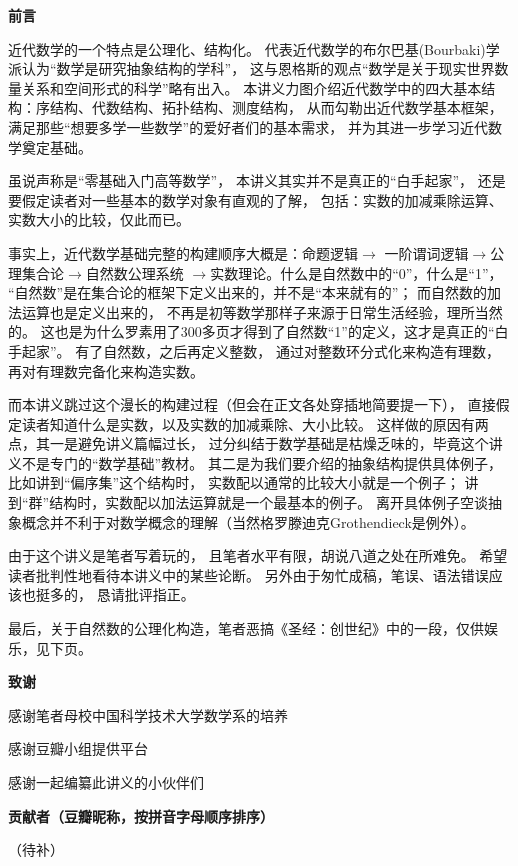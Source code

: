\textbf{前言}

近代数学的一个特点是公理化、结构化。
代表近代数学的布尔巴基(Bourbaki)学派认为“数学是研究抽象结构的学科”，
这与恩格斯的观点“数学是关于现实世界数量关系和空间形式的科学”略有出入。
本讲义力图介绍近代数学中的四大基本结构：序结构、代数结构、拓扑结构、测度结构，
从而勾勒出近代数学基本框架，满足那些“想要多学一些数学”的爱好者们的基本需求，
并为其进一步学习近代数学奠定基础。

虽说声称是“零基础入门高等数学”，
本讲义其实并不是真正的“白手起家”，
还是要假定读者对一些基本的数学对象有直观的了解，
包括：实数的加减乘除运算、实数大小的比较，仅此而已。

事实上，近代数学基础完整的构建顺序大概是：命题逻辑$\rightarrow$
一阶谓词逻辑$\rightarrow$公理集合论$\rightarrow$自然数公理系统
$\rightarrow$实数理论。什么是自然数中的“0”，什么是“1”，
“自然数”是在集合论的框架下定义出来的，并不是“本来就有的”；
而自然数的加法运算也是定义出来的，
不再是初等数学那样子来源于日常生活经验，理所当然的。
这也是为什么罗素用了300多页才得到了自然数“1”的定义，这才是真正的“白手起家”。
有了自然数，之后再定义整数，
通过对整数环分式化来构造有理数，
再对有理数完备化来构造实数。

而本讲义跳过这个漫长的构建过程（但会在正文各处穿插地简要提一下），
直接假定读者知道什么是实数，以及实数的加减乘除、大小比较。
这样做的原因有两点，其一是避免讲义篇幅过长，
过分纠结于数学基础是枯燥乏味的，毕竟这个讲义不是专门的“数学基础”教材。
其二是为我们要介绍的抽象结构提供具体例子，比如讲到“偏序集”这个结构时，
实数配以通常的比较大小就是一个例子；
讲到“群”结构时，实数配以加法运算就是一个最基本的例子。
离开具体例子空谈抽象概念并不利于对数学概念的理解（当然格罗滕迪克Grothendieck是例外）。

由于这个讲义是笔者写着玩的，
且笔者水平有限，胡说八道之处在所难免。
希望读者批判性地看待本讲义中的某些论断。
另外由于匆忙成稿，笔误、语法错误应该也挺多的，
恳请批评指正。

最后，关于自然数的公理化构造，笔者恶搞《圣经：创世纪》中的一段，仅供娱乐，见下页。
\vspp\vspp

\textbf{致谢}

感谢笔者母校中国科学技术大学数学系的培养

感谢豆瓣小组提供平台

感谢一起编纂此讲义的小伙伴们

\vspp
\textbf{贡献者（豆瓣昵称，按拼音字母顺序排序）}

（待补）

\newpage

